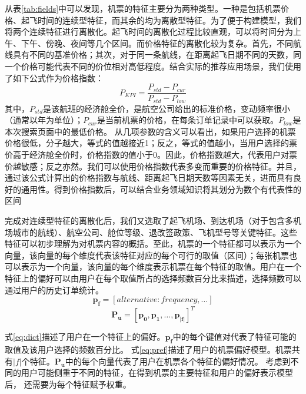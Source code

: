 从表\ref{tab:fields}中可以发现，机票的特征主要分为两种类型。一种是包括机票价格、起飞时间的连续型特征，而其余的均为离散型特征。为了便于构建模型，我们将两个连续特征进行离散化。起飞时间的离散化过程比较直观，可以将时间分为上午、下午、傍晚、夜间等几个区间。而价格特征的离散化较为复杂。首先，不同航线具有不同的基准价格；其次，对于同一条航线，在距离起飞日期不同的天数，同一个价格可能代表不同的价位相对高低程度。结合实际的推荐应用场景，我们使用了如下公式作为价格指数：\\
\begin{equation}
	P_{KPI} = \frac{P_{std} - P_{cur}}{P_{std} - P_{low}}
\end{equation}
其中，$P_{std}$是该航班的经济舱全价，是航空公司给出的标准价格，变动频率很小（通常以年为单位）；$P_{cur}$是当前机票的价格，在每条订单记录中可以获取。$P_{low}$是本次搜索页面中的最低价格。
从几项参数的含义可以看出，如果用户选择的机票价格很低，分子越大，等式的值越接近1；反之，等式的值越小，当用户选择的票价高于经济舱全价时，价格指数的值小于0。因此，价格指数越大，代表用户对票价越敏感；反之亦然。我们可以使用价格指数代表多变而重要的价格特征。并且，通过该公式计算出的价格指数与航线、距离起飞日期天数等因素无关，进而具有良好的通用性。得到价格指数后，可以结合业务领域知识将其划分为数个有代表性的区间\par
完成对连续型特征的离散化后，我们又选取了起飞机场、到达机场（对于包含多机场城市的航线）、航空公司、舱位等级、退改签政策、飞机型号等关键特征。这些特征可以初步理解为对机票内容的概括。至此，机票的一个特征都可以表示为一个向量，该向量的每个维度代表该特征对应的每个可行的取值（区间）；每张机票也可以表示为一个向量，该向量的每个维度表示机票在每个特征的取值。用户在一个特征上的偏好可以由用户在每个取值所占的选择频数百分比来描述，选择频数可以通过用户的历史订单统计。\\
\begin{equation}
\label{eq:dict}
	\mathbf{p_f} = [alternative:frequency,\dots]
\end{equation}
\begin{equation}
\label{eq:pref}
	\mathbf{P_u} = [\mathbf{p_0},\mathbf{p_1},\dots,\mathbf{p_{|f|}}]^T
\end{equation}\par
式\ref{eq:dict}描述了用户在一个特征上的偏好。$\mathbf{p_f}$中的每个键值对代表了特征可能的取值及该用户选择的频数百分比。
式\ref{eq:pref}描述了用户的机票偏好模型。机票共有$|f|$个特征。$\mathbf{P_u}$中的每个向量代表了用户在机票各个特征的偏好情况。
考虑到不同的用户可能侧重于不同的特征，在得到机票的主要特征和用户的偏好表示模型后，
还需要为每个特征赋予权重。

